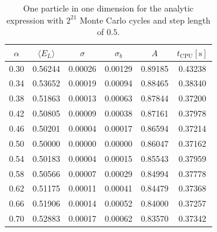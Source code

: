 \documentclass[
    a4paper, aps, twocolumn, floatfix, superscriptaddress, nofootinbib]{revtex4-1}
\newcommand{\1}{\mathds{1}}
\begin{document}
        \begin{table}
            \centering
            \caption{One particle in one dimension for the analytic expression
            with $2^{21}$ Monte Carlo cycles and step length of $0.5$.}
            \begin{ruledtabular}
                \begin{tabular}{cccccc}
                    $\alpha$ & $\langle  E_L\rangle$ & $\sigma$ & $\sigma_b$ & $A$
                    & $t_{\text{CPU}} [\si{\second}]$ \\
                    \hline
                    0.30&0.56244&0.00026&0.00129&0.89185&0.43238\\
                    0.34&0.53652&0.00019&0.00094&0.88465&0.38340\\
                    0.38&0.51863&0.00013&0.00063&0.87844&0.37200\\
                    0.42&0.50805&0.00009&0.00038&0.87161&0.37978\\
                    0.46&0.50201&0.00004&0.00017&0.86594&0.37214\\
                    0.50&0.50000&0.00000&0.00000&0.86047&0.37162\\
                    0.54&0.50183&0.00004&0.00015&0.85543&0.37959\\
                    0.58&0.50566&0.00007&0.00029&0.84994&0.37778\\
                    0.62&0.51175&0.00011&0.00041&0.84479&0.37368\\
                    0.66&0.51906&0.00014&0.00052&0.84000&0.37257\\
                    0.70&0.52883&0.00017&0.00062&0.83570&0.37342\\
                \end{tabular}
            \end{ruledtabular}
            \label{tab:1D1N_analytic}
        \end{table}
\end{document}
